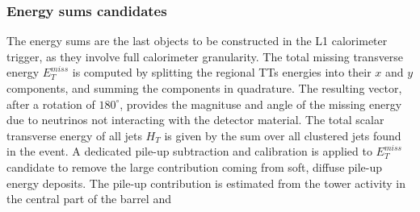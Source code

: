 \subsubsection{Energy sums candidates}

The energy sums are the last objects to be constructed in the L1 calorimeter trigger, as they involve full calorimeter granularity.
The total missing transverse energy $E_T^{miss}$ is computed by splitting the regional TTs energies into their $x$ and $y$ components, and summing the components in quadrature.
The resulting vector, after a rotation of $180^{\circ}$, provides the magnituse and angle of the missing energy due to neutrinos not interacting with the detector material.
The total scalar transverse energy of all jets $H_T$ is given by the sum over all clustered jets found in the event.
A dedicated pile-up subtraction and calibration is applied to $E_T^{miss}$ candidate to remove the large contribution coming from soft, diffuse pile-up energy deposits.
The pile-up contribution is estimated from the tower activity in the central part of the barrel and 

